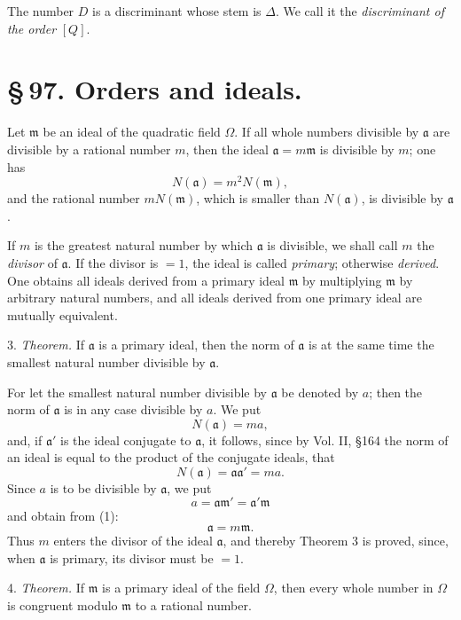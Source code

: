 \documentclass[11pt]{article}
\begin{document}
The number $D$ is a discriminant whose stem is $\Delta$. We call it the \emph{discriminant of the order} $[Q]$.


\section*{\S\,97. Orders and ideals.}

Let $\mathfrak m$ be an ideal of the quadratic field $\Omega$. If all whole numbers divisible by $\mathfrak a$ are divisible by a rational number $m$, then the ideal $\mathfrak a=m\mathfrak m$ is divisible by $m$; one has
\[
 N(\mathfrak a)=m^2N(\mathfrak m),
\]
and the rational number $mN(\mathfrak m)$, which is smaller than $N(\mathfrak a)$, is divisible by $\mathfrak a$.

If $m$ is the greatest natural number by which $\mathfrak a$ is divisible, we shall call $m$ the \emph{divisor} of $\mathfrak a$. If the divisor is $=1$, the ideal is called \emph{primary}; otherwise \emph{derived}. One obtains all ideals derived from a primary ideal $\mathfrak m$ by multiplying $\mathfrak m$ by arbitrary natural numbers, and all ideals derived from one primary ideal are mutually equivalent.

3. \emph{Theorem.} If $\mathfrak a$ is a primary ideal, then the norm of $\mathfrak a$ is at the same time the smallest natural number divisible by $\mathfrak a$.

For let the smallest natural number divisible by $\mathfrak a$ be denoted by $a$; then the norm of $\mathfrak a$ is in any case divisible by $a$. We put
\[
 N(\mathfrak a)=ma,
\]
and, if $\mathfrak a'$ is the ideal conjugate to $\mathfrak a$, it follows, since by Vol. II, \S 164 the norm of an ideal is equal to the product of the conjugate ideals, that
\begin{equation}
 N(\mathfrak a)=\mathfrak a\mathfrak a'=ma.
\tag{1}
\end{equation}
Since $a$ is to be divisible by $\mathfrak a$, we put
\[
 a=\mathfrak a\mathfrak m'=\mathfrak a'\mathfrak m
\]
and obtain from (1):
\begin{equation}
 \mathfrak a=m\mathfrak m.
\tag{2}
\end{equation}
Thus $m$ enters the divisor of the ideal $\mathfrak a$, and thereby Theorem 3 is proved, since, when $\mathfrak a$ is primary, its divisor must be $=1$.

4. \emph{Theorem.} If $\mathfrak m$ is a primary ideal of the field $\Omega$, then every whole number in $\Omega$ is congruent modulo $\mathfrak m$ to a rational number.
\end{document}
